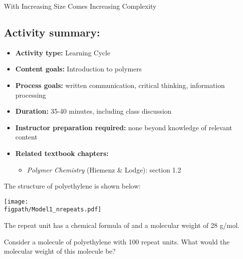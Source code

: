 \begin{activity}{With Increasing Size Comes Increasing Complexity}
\begin{instructornotes}
	\subsection*{Activity summary:}
	\begin{itemize}
		\item \textbf{Activity type:} Learning Cycle
		\item \textbf{Content goals:} Introduction to polymers
		\item \textbf{Process goals:} %
			written communication, critical thinking, information processing
		\item \textbf{Duration:} 35-40 minutes, including class discussion
		\item \textbf{Instructor preparation required:} none beyond knowledge of relevant content
		\item \textbf{Related textbook chapters:}
			\begin{itemize}
				\item \emph{Polymer Chemistry} (Hiemenz \& Lodge): section 1.2
			\end{itemize}
	\end{itemize}
	
\end{instructornotes}




\begin{model}
\label{\labelbase:mdl:polyethyleneMW}

	The structure of polyethylene is shown below:

	\vspace{6pt}
	\centerline{\texttt{[image: \\figpath/Model1\_nrepeats.pdf]}}
	\vspace{6pt}
	
	The repeat unit has a chemical formula of  and a molecular weight of 28 g/mol.

\end{model}


\begin{ctqs}

	\question Consider a molecule of polyethylene with 100 repeat units.  What would the molecular weight of this molecule be?
			

\end{ctqs}
\end{activity}
